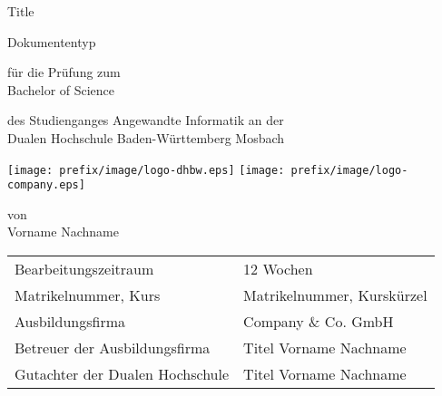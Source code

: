 \def\doctype{Dokumententyp}
\def\title{Title}
\def\author{Vorname Nachname}

\begin{titlepage}

	\vspace{10mm}

	\begin{center}
		\vspace{5mm}

		\huge \title

		\vspace{14.2pt}

		\large \doctype


		\vspace{42.6pt}

		\small für die Prüfung zum \\
		\large Bachelor of Science

		\vspace{42.6pt}

		\small des Studienganges Angewandte Informatik an der \\
		\large Dualen Hochschule Baden-Württemberg Mosbach

		\vspace{14.2pt}

		\texttt{[image: prefix/image/logo-dhbw.eps]}
		\hspace{35pt}
		\texttt{[image: prefix/image/logo-company.eps]}

		\vspace{42.6pt}

		\small von \\
		\large \author
	\end{center}

	\vspace{98.6pt}

	\begin{table}[h]
		\centering
		\begin{tabular}{ll}
			\small Bearbeitungszeitraum            & 12 Wochen                  \\
			\small Matrikelnummer, Kurs            & Matrikelnummer, Kurskürzel \\
			\small Ausbildungsfirma                & Company \& Co. GmbH        \\
			\small Betreuer der Ausbildungsfirma   & Titel Vorname Nachname     \\
			\small Gutachter der Dualen Hochschule & Titel Vorname Nachname     \\
		\end{tabular}
	\end{table}

	\vspace{49.7pt}


\end{titlepage}
